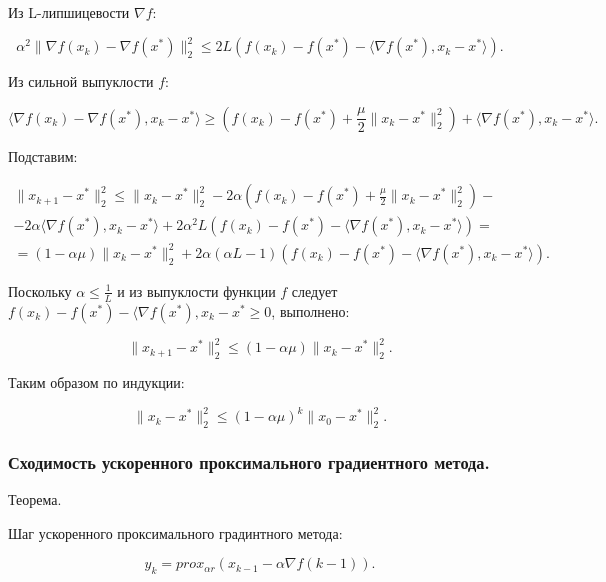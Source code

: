 Из L-липшицевости $\nabla f$:

\begin{equation}
    \alpha^2\|\nabla f(x_k)-\nabla f(x^*)\|_2^2\leq
    2L\left(f(x_k)-f(x^*)-\langle\nabla f(x^*),x_k-x^*\rangle\right).
\end{equation}

Из сильной выпуклости $f$:

\begin{equation}
    \langle\nabla f(x_k)-\nabla f(x^*),x_k-x^*\rangle\geq
    \left(f(x_k)-f(x^*)+\frac\mu2\|x_k-x^*\|_2^2\right)+\langle\nabla f(x^*),x_k-x^*\rangle.
\end{equation}

Подставим:

\begin{equation}
\begin{aligned}
    \|x_{k+1}-x^*\|_2^2\leq
    \|x_k-x^*\|_2^2-
    2\alpha\left(f(x_k)-f(x^*)+\frac\mu2\|x_k-x^*\|_2^2\right)-\\-
    2\alpha\langle\nabla f(x^*),x_k-x^*\rangle+
    2\alpha^2 L\left(f(x_k)-f(x^*)-\langle\nabla f(x^*),x_k-x^*\rangle\right)=\\=
    (1-\alpha\mu)\|x_k-x^*\|_2^2+
    2\alpha(\alpha L-1)\left(f(x_k)-f(x^*)-\langle\nabla f(x^*),x_k-x^*\rangle\right).
\end{aligned}
\end{equation}

Поскольку $\alpha\leq\frac1L$ и из выпуклости функции $f$ следует $f(x_k)-f(x^*)-\langle\nabla f(x^*),x_k-x^*\geq0$, выполнено:

\begin{equation}
    \|x_{k+1}-x^*\|_2^2\leq(1-\alpha\mu)\|x_k-x^*\|_2^2.
\end{equation}

Таким образом по индукции:

\begin{equation}
    \|x_k-x^*\|_2^2\leq(1-\alpha\mu)^k\|x_0-x^*\|_2^2.
\end{equation}

\subsubsection*{Сходимость ускоренного проксимального градиентного метода.}

Теорема.

Шаг ускоренного проксимального градинтного метода:

\begin{equation}
    y_k=prox_{\alpha r}(x_{k-1}-\alpha\nabla f({k-1})).
\end{equation}

